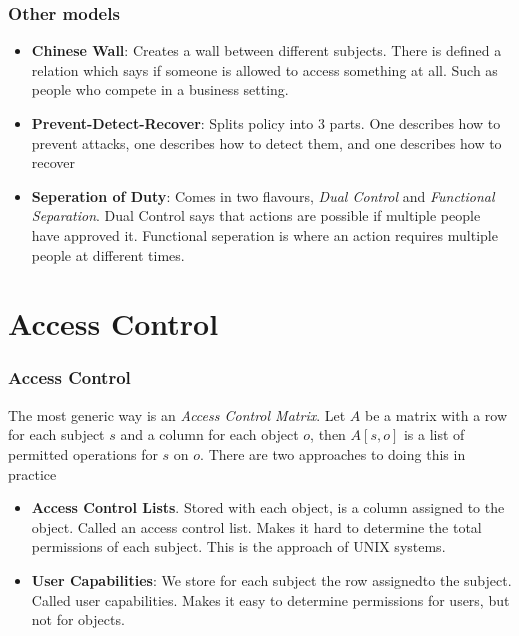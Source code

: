 \documentclass[14pt]{beamer}
\begin{document}
    \begin{frame}
        \frametitle{Other models}
            \begin{itemize}
                \item \textbf{Chinese Wall}: Creates a wall between different subjects. There is defined a relation which says if someone is allowed to access something at all. Such as people who compete in a business setting. 
                \item \textbf{Prevent-Detect-Recover}: Splits policy into 3 parts. One describes how to prevent attacks, one describes how to detect them, and one describes how to recover
                \item \textbf{Seperation of Duty}: Comes in two flavours, \textit{Dual Control} and \textit{Functional Separation}. Dual Control says that actions are possible if multiple people have approved it. Functional seperation is where an action requires multiple people at different times. 
            \end{itemize}
    \end{frame}

\section{Access Control}
        \begin{frame}
            \frametitle{Access Control}
                The most generic way is an \textit{Access Control Matrix}. Let $A$ be a matrix with a row for each subject $s$ and a column for each object $o$, then $A[s, o]$ is a list of permitted operations for $s$ on $o$. 
                There are two approaches to doing this in practice
                \begin{itemize}
                    \item \textbf{Access Control Lists}. Stored with each object, is a column assigned to the object. Called an access control list. Makes it hard to determine the total permissions of each subject. This is the approach of UNIX systems. 
                    \item \textbf{User Capabilities}: We store for each subject the row assignedto the subject. Called user capabilities. Makes it easy to determine permissions for users, but not for objects. 
                \end{itemize}
        \end{frame}
\end{document}

